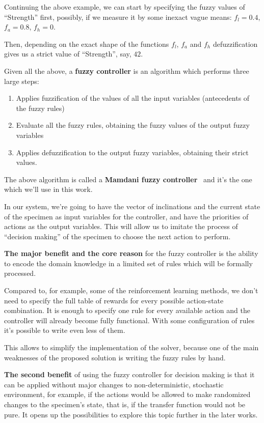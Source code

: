 \documentclass[12pt, a4paper]{report}
\begin{document}
  Continuing the above example, we can start by specifying the fuzzy values of ``Strength'' first, possibly, if we measure it by some inexact vague means:
  $f_l = 0.4$, $f_a = 0.8$, $f_h = 0$.

  Then, depending on the exact shape of the functions $f_l$, $f_a$ and $f_h$ defuzzification gives us a strict value of ``Strength'', say, $42$.

  Given all the above, a \textbf{fuzzy controller} is an algorithm which performs three large steps:

  \begin{enumerate}
    \item Applies fuzzification of the values of all the input variables (antecedents of the fuzzy rules)
    \item Evaluate all the fuzzy rules, obtaining the fuzzy values of the output fuzzy variables
    \item Applies defuzzification to the output fuzzy variables, obtaining their strict values.
  \end{enumerate}

  The above algorithm is called a \textbf{Mamdani fuzzy controller}~\cite{fuzzy::Mamdani} and it's the one which we'll use in this work.

  In our system, we're going to have the vector of inclinations and the current state of the specimen as input variables for the controller,
  and have the priorities of actions as the output variables.
  This will allow us to imitate the process of ``decision making'' of the specimen to choose the next action to perform.

	\textbf{The major benefit and the core reason} for the fuzzy controller is the ability to encode the domain knowledge in a limited set of rules which will be formally processed.

	Compared to, for example, some of the reinforcement learning methods, we don't need to specify the full table of rewards for every possible action-state combination.
	It is enough to specify one rule for every available action and the controller will already become fully functional.
	With some configuration of rules it's possible to write even less of them.

	This allows to simplify the implementation of the solver, because one of the main weaknesses of the proposed solution is writing the fuzzy rules by hand.

  \textbf{The second benefit} of using the fuzzy controller for decision making is that it can be applied without major changes to non-deterministic, stochastic environment,
  for example, if the actions would be allowed to make randomized changes to the specimen's state, that is, if the transfer function would not be pure.
  It opens up the possibilities to explore this topic further in the later works.
\end{document}
